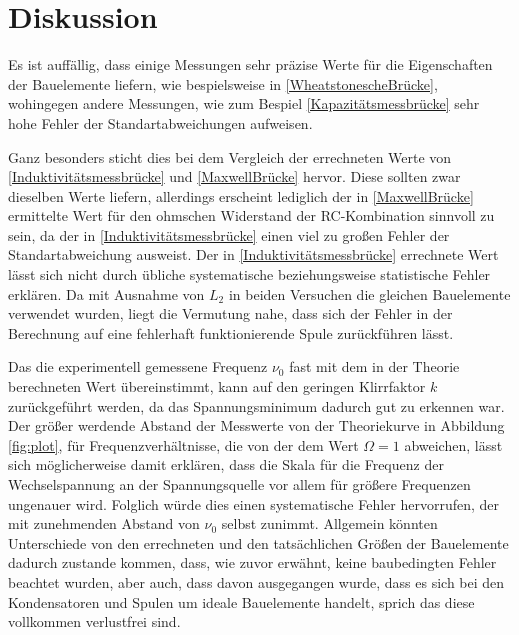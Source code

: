 \section{Diskussion}
\label{sec:Diskussion}

Es ist auffällig, dass einige Messungen sehr präzise Werte für die Eigenschaften der Bauelemente liefern, wie 
bespielsweise in \ref{WheatstonescheBrücke}, wohingegen andere Messungen, wie zum Bespiel \ref{Kapazitätsmessbrücke} sehr 
hohe Fehler der Standartabweichungen aufweisen.

Ganz besonders sticht dies bei dem Vergleich der errechneten Werte von \ref{Induktivitätsmessbrücke} und \ref{MaxwellBrücke} hervor.
Diese sollten zwar dieselben Werte liefern, allerdings erscheint lediglich der in \ref{MaxwellBrücke} ermittelte Wert für den 
ohmschen Widerstand der RC-Kombination sinnvoll zu sein, da der in \ref{Induktivitätsmessbrücke} einen viel zu großen Fehler der 
Standartabweichung ausweist. Der in \ref{Induktivitätsmessbrücke} errechnete Wert lässt sich nicht durch übliche systematische beziehungsweise
statistische Fehler erklären. Da mit Ausnahme von $L_{2}$ in beiden Versuchen die gleichen Bauelemente verwendet wurden, liegt 
die Vermutung nahe, dass sich der Fehler in der Berechnung auf eine fehlerhaft funktionierende Spule zurückführen lässt.

Das die experimentell gemessene Frequenz $\nu_{0}$ fast mit dem in der Theorie berechneten Wert übereinstimmt, kann auf den 
geringen Klirrfaktor $k$ zurückgeführt werden, da das Spannungsminimum dadurch gut zu erkennen war. Der größer werdende Abstand der Messwerte von der Theoriekurve in Abbildung \ref{fig:plot}, 
für Frequenzverhältnisse, die von der dem Wert $\Omega = 1$ abweichen, lässt sich möglicherweise damit erklären, dass die Skala für 
die Frequenz der Wechselspannung an der Spannungsquelle vor allem für größere Frequenzen ungenauer wird. Folglich würde dies einen 
systematische Fehler hervorrufen, der mit zunehmenden Abstand von $\nu_{0}$ selbst zunimmt.
Allgemein könnten Unterschiede von den errechneten und den tatsächlichen Größen der Bauelemente dadurch zustande kommen, dass, wie zuvor erwähnt,
keine baubedingten Fehler beachtet wurden, aber auch, dass davon ausgegangen wurde, dass es sich bei den Kondensatoren und Spulen um ideale 
Bauelemente handelt, sprich das diese vollkommen verlustfrei sind.

